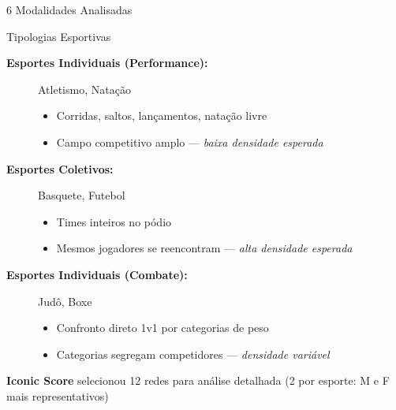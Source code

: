 \begin{frame}{6 Modalidades Analisadas}
    \begin{block}{Tipologias Esportivas}
        \begin{description}
            \item[\textbf{Esportes Individuais (Performance):}] Atletismo, Natação
            \begin{itemize}
                \item Corridas, saltos, lançamentos, natação livre
                \item Campo competitivo amplo --- \textit{baixa densidade esperada}
            \end{itemize}

            \item[\textbf{Esportes Coletivos:}] Basquete, Futebol
            \begin{itemize}
                \item Times inteiros no pódio
                \item Mesmos jogadores se reencontram --- \textit{alta densidade esperada}
            \end{itemize}

            \item[\textbf{Esportes Individuais (Combate):}] Judô, Boxe
            \begin{itemize}
                \item Confronto direto 1v1 por categorias de peso
                \item Categorias segregam competidores --- \textit{densidade variável}
            \end{itemize}
        \end{description}
    \end{block}

    \vspace{0.2cm}
    \begin{center}
        \footnotesize
        \textbf{Iconic Score} selecionou 12 redes para análise detalhada (2 por esporte: M e F mais representativos)
    \end{center}
\end{frame}
